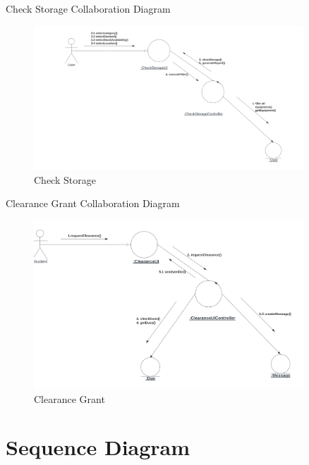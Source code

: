 \documentclass[20pt]{beamer}
\numberwithin{figure}{section}
\begin{document}
\begin{frame}{Check Storage Collaboration Diagram}

     \begin{figure}
        \centering
        \includegraphics[width= 0.9\textwidth , height= 0.6\paperheight]{CheckStorageCollab.png}
        \caption{Check Storage}
        \label{fig:26}
    \end{figure}

\end{frame}

\begin{frame}{Clearance Grant Collaboration Diagram}

     \begin{figure}
        \centering
        \includegraphics[width= 0.9\textwidth , height= 0.6\paperheight]{ClearanceCollab.png}
        \caption{Clearance Grant}
        \label{fig:27}
    \end{figure}

\end{frame}

\section{Sequence Diagram}
\end{document}

